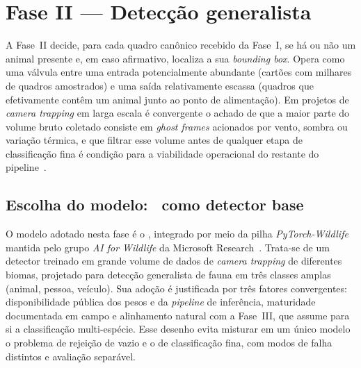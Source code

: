 \section{Fase II --- Detecção generalista}
\label{sec:pipeline-fase2}

A Fase~II decide, para cada quadro canônico recebido da Fase~I, se há ou não um animal presente e, em caso afirmativo, localiza a sua \emph{bounding box}. Opera como uma válvula entre uma entrada potencialmente abundante (cartões com milhares de quadros amostrados) e uma saída relativamente escassa (quadros que efetivamente contêm um animal junto ao ponto de alimentação). Em projetos de \emph{camera trapping} em larga escala é convergente o achado de que a maior parte do volume bruto coletado consiste em \emph{ghost frames} acionados por vento, sombra ou variação térmica, e que filtrar esse volume antes de qualquer etapa de classificação fina é condição para a viabilidade operacional do restante do pipeline~\cite{bruce2025largescale,velez2022choosing,swanson2015snapshot,mulero2025addressing}.

\subsection*{Escolha do modelo: \modeloMD~como detector base}

O modelo adotado nesta fase é o \modeloMD, integrado por meio da pilha \emph{PyTorch-Wildlife} mantida pelo grupo \emph{AI for Wildlife} da Microsoft Research~\cite{hernandez2024pytorchwildlife,microsoft_cameratraps_repo}. Trata-se de um detector treinado em grande volume de dados de \emph{camera trapping} de diferentes biomas, projetado para detecção generalista de fauna em três classes amplas (animal, pessoa, veículo). Sua adoção é justificada por três fatores convergentes: disponibilidade pública dos pesos e da \emph{pipeline} de inferência, maturidade documentada em campo e alinhamento natural com a Fase~III, que assume para si a classificação multi-espécie. Esse desenho evita misturar em um único modelo o problema de rejeição de vazio e o de classificação fina, com modos de falha distintos e avaliação separável.

